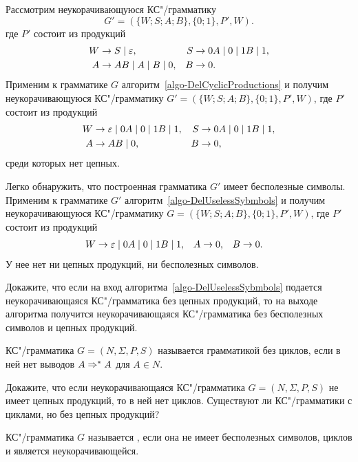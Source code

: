 \begin{myexample}
Рассмотрим неукорачивающуюся КС"/грамматику
\[
    G'=(\{W;S;A;B\},\{0;1\},P',W).
\]
где $P'$ состоит из продукций
\begin{align*}
	W & \to S \mid \varepsilon, &
	S &\to 0A \mid 0 \mid 1B \mid 1, \\
    A &\to AB \mid A \mid B \mid 0, &
	B &\to 0.
\end{align*}
Применим к грамматике $G$ алгоритм~\ref{algo-DelCyclicProductions}  и получим неукорачивающуюся КС"/грамматику $G'=(\{W;S;A;B\},\{0;1\},P',W)$, где $P'$ состоит из продукций
\begin{align*}
	W &\to \varepsilon \mid 0A \mid 0 \mid 1B \mid 1, &
    S &\to 0A \mid 0 \mid 1B \mid 1, \\
    A &\to AB \mid 0, &
    B &\to 0,
\end{align*}
среди которых нет цепных.

Легко обнаружить, что построенная грамматика $G'$ имеет бесполезные символы. Применим к грамматике $G'$ алгоритм~\ref{algo-DelUselessSybmbols} и получим неукорачивающуюся КС"/грамматику $G=(\{W;S;A;B\},\{0;1\},P',W)$, где $P'$ состоит из продукций
\begin{align*}
	W &\to \varepsilon \mid 0A \mid 0 \mid 1B \mid 1, &
    A &\to 0, &
    B &\to 0.
\end{align*}
У нее нет ни цепных продукций, ни бесполезных символов.
\end{myexample}

\begin{myproblem}
\label{problem-GrammarToEpsFreeGrammarWOCyclicSymbols}
Докажите, что если на вход алгоритма~\ref{algo-DelUselessSybmbols} подается неукорачивающаяся КС"/грамматика без цепных продукций, то на выходе алгоритма получится неукорачивающаяся КС"/грамматика без бесполезных символов и цепных продукций.

КС"/грамматика $G=(N,\Sigma,P,S)$ называется грамматикой без циклов, если в ней нет выводов $A\Rightarrow^*A$ для $A\in N$.
\end{myproblem}

\begin{myproblem}
Докажите, что если неукорачивающаяся КС"/грамматика $G=(N,\Sigma,P,S)$ не имеет цепных продукций, то в ней нет циклов. Существуют ли КС"/грамматики с циклами, но без цепных продукций?
\end{myproblem}

КС"/грамматика $G$ называется , если она не имеет бесполезных символов, циклов и является неукорачивающейся.

